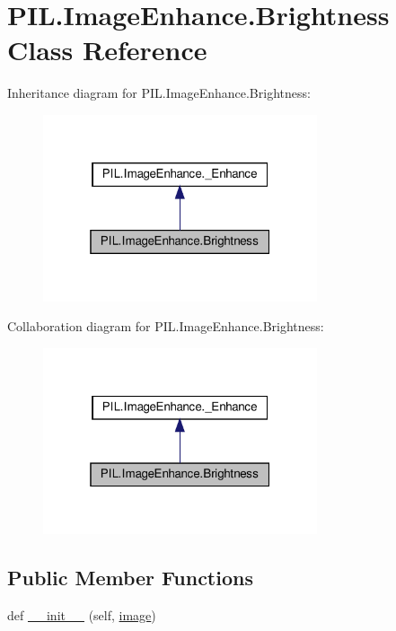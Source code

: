 \hypertarget{classPIL_1_1ImageEnhance_1_1Brightness}{}\section{P\+I\+L.\+Image\+Enhance.\+Brightness Class Reference}
\label{classPIL_1_1ImageEnhance_1_1Brightness}


Inheritance diagram for P\+I\+L.\+Image\+Enhance.\+Brightness\+:
\nopagebreak
\begin{figure}[H]
\begin{center}
\leavevmode
\includegraphics[width=229pt]{classPIL_1_1ImageEnhance_1_1Brightness__inherit__graph}
\end{center}
\end{figure}


Collaboration diagram for P\+I\+L.\+Image\+Enhance.\+Brightness\+:
\nopagebreak
\begin{figure}[H]
\begin{center}
\leavevmode
\includegraphics[width=229pt]{classPIL_1_1ImageEnhance_1_1Brightness__coll__graph}
\end{center}
\end{figure}
\subsection*{Public Member Functions}
\begin{DoxyCompactItemize}
\item 
def \hyperlink{classPIL_1_1ImageEnhance_1_1Brightness_a1dfdde5a038298050c7d76601a60d5d3}{\+\_\+\+\_\+init\+\_\+\+\_\+} (self, \hyperlink{classPIL_1_1ImageEnhance_1_1Brightness_a23f1bdddf742e3eba6c540b351372340}{image})
\end{DoxyCompactItemize}
